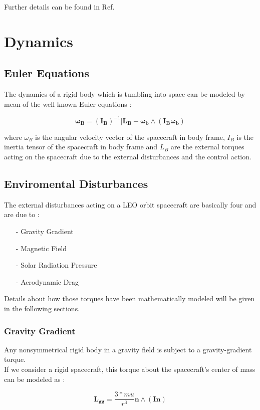 \documentclass[11pt,a4paper]{report}
\begin{document}
Further details can be found in Ref. \cite{notes:bigss}
\section{Dynamics}
\subsection{Euler Equations}
The dynamics of a rigid body which is tumbling into space can be modeled by mean of the well known Euler equations : 

\begin{equation}
  \mathbf{\omega_B} = \mathbf{(I_B)}^{-1} [\mathbf{L_B} - \mathbf{\omega_b}  \wedge (\mathbf{I_B} \mathbf{\omega_b})
\end{equation}

where \textbf{$\omega_B$} is the angular velocity vector of the spacecraft in body frame, \textbf{$I_B$} is the inertia tensor of the spacecraft in body frame and \textbf{$L_B$} are the external torques acting on the spacecraft due to the external disturbances and the control action.

\subsection{Enviromental Disturbances} \label{sec:disturbances}
The external disturbances acting on a LEO orbit spacecraft are basically four and are due to :

\begin{itemize}
  \item[-] Gravity Gradient
  \item[-] Magnetic Field 
  \item[-] Solar Radiation Pressure
  \item[-] Aerodynamic Drag
\end{itemize}

Details about how those torques have been mathematically modeled will be given in the following sections.

\subsubsection{Gravity Gradient}
Any nonsymmetrical rigid body in a gravity field is subject to a gravity-gradient torque.\\
If we consider a rigid spacecraft, this torque about the spacecraft's center of mass can be modeled as :

\begin{equation}
 \mathbf{L_{gg}} = \frac{3*mu}{r^3} \mathbf{n} \wedge (\mathbf{I} \mathbf{n})
\end{equation}
\end{document}
